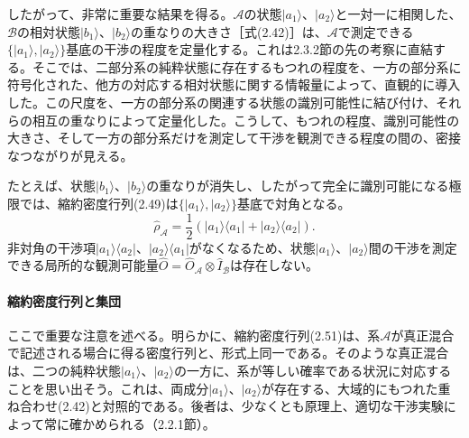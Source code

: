 したがって、非常に重要な結果を得る。$\mathcal A$の状態$\lvert a_1\rangle$、$\lvert a_2\rangle$と一対一に相関した、$\mathcal B$の相対状態$\lvert b_1\rangle$、$\lvert b_2\rangle$の重なりの大きさ［式(2.42)］は、$\mathcal A$で測定できる$\{\lvert a_1\rangle,\lvert a_2\rangle\}$基底の干渉の程度を定量化する。これは2.3.2節の先の考察に直結する。そこでは、二部分系の純粋状態に存在するもつれの程度を、一方の部分系に符号化された、他方の対応する相対状態に関する情報量によって、直観的に導入した。この尺度を、一方の部分系の関連する状態の識別可能性に結び付け、それらの相互の重なりによって定量化した。こうして、もつれの程度、識別可能性の大きさ、そして一方の部分系だけを測定して干渉を観測できる程度の間の、密接なつながりが見える。

\hypertarget{srcpage:48}{}\label{srcpage:48}
たとえば、状態$\lvert b_1\rangle$、$\lvert b_2\rangle$の重なりが消失し、したがって完全に識別可能になる極限では、縮約密度行列(2.49)は$\{\lvert a_1\rangle,\lvert a_2\rangle\}$基底で対角となる。
\begin{equation}\hat\rho_{\mathcal A}=\frac12(\lvert a_1\rangle\langle a_1\rvert+\lvert a_2\rangle\langle a_2\rvert).\tag{2.51}\end{equation}
非対角の干渉項$\lvert a_1\rangle\langle a_2\rvert$、$\lvert a_2\rangle\langle a_1\rvert$がなくなるため、状態$\lvert a_1\rangle$、$\lvert a_2\rangle$間の干渉を測定できる局所的な観測可能量$\hat O=\hat O_{\mathcal A}\otimes\hat I_{\mathcal B}$は存在しない。

\paragraph{縮約密度行列と集団}
ここで重要な注意を述べる。明らかに、縮約密度行列(2.51)は、系$\mathcal A$が真正混合で記述される場合に得る密度行列と、形式上同一である。そのような真正混合は、二つの純粋状態$\lvert a_1\rangle$、$\lvert a_2\rangle$の一方に、系が等しい確率である状況に対応することを思い出そう。これは、両成分$\lvert a_1\rangle$、$\lvert a_2\rangle$が存在する、大域的にもつれた重ね合わせ(2.42)と対照的である。後者は、少なくとも原理上、適切な干渉実験によって常に確かめられる（2.2.1節）。

